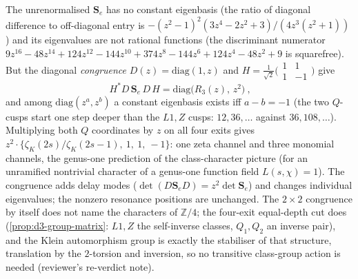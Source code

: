 \begin{theorem}
\label{thm:d3-height-diagonalisation}
The unrenormalised $\mathbf S_e$ has no constant eigenbasis (the ratio of diagonal difference to
off-diagonal entry is $-(z^2-1)^2(3z^4-2z^2+3)/(4z^3(z^2+1))$) and its eigenvalues are not rational
functions (the discriminant numerator $9z^{16}-48z^{14}+124z^{12}-144z^{10}+374z^8-144z^6+124z^4-48z^2+9$ is
squarefree). But the diagonal \emph{congruence} $D(z) = \mathrm{diag}(1,z)$ and $H = \frac1{\sqrt2}
\big(\begin{smallmatrix}1&1\\1&-1\end{smallmatrix}\big)$ give
\[
\boxed{\ H^{*}D\,\mathbf S_e\,D\,H = \mathrm{diag}\big(R_3(z),\,z^2\big)\ } ,
\]
and among $\mathrm{diag}(z^a,z^b)$ a constant eigenbasis exists iff $a-b = -1$ (the two $Q$-cusps start one
step deeper than the $L1,Z$ cusps: $12,36,\dots$ against $36,108,\dots$). Multiplying both $Q$ coordinates by
$z$ on all four exits gives $z^2\cdot\{\zeta_K(2s)/\zeta_K(2s-1),\ 1,\ 1,\ -1\}$: one zeta channel and three
monomial channels, the genus-one prediction of the class-character picture (for an unramified nontrivial
character of a genus-one function field $L(s,\chi) = 1$). The congruence adds delay modes
($\det(D\mathbf S_eD) = z^2\det\mathbf S_e$) and changes individual eigenvalues; the nonzero resonance
positions are unchanged. The $2\times2$ congruence by itself does not name the characters of $\mathbb Z/4$; the
four-exit equal-depth cut does (\cref{prop:d3-group-matrix}: $L1,Z$ the self-inverse classes, $Q_1,Q_2$ an inverse
pair), and the Klein automorphism group is exactly the stabiliser of that structure, translation by the $2$-torsion
and inversion, so no transitive class-group action is needed (reviewer's re-verdict note).
\end{theorem}

